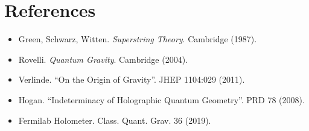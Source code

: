 \documentclass[12pt]{article}
\begin{document}
\section{References}
\begin{itemize}
\item Green, Schwarz, Witten. \textit{Superstring Theory}. Cambridge (1987).
\item Rovelli. \textit{Quantum Gravity}. Cambridge (2004).
\item Verlinde. ``On the Origin of Gravity''. JHEP 1104:029 (2011).
\item Hogan. ``Indeterminacy of Holographic Quantum Geometry''. PRD 78 (2008).
\item Fermilab Holometer. Class. Quant. Grav. 36 (2019).
\end{itemize}
\end{document}
